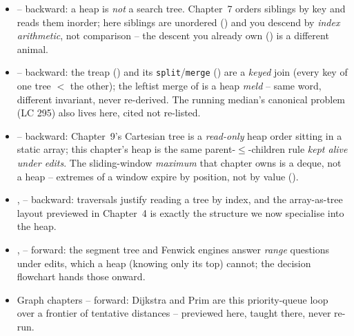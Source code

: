 
\begin{itemize}[nosep, leftmargin=1.4em]
  \item {} -- backward: a heap is \emph{not} a search tree. Chapter~7 orders siblings by key and
        reads them inorder; here siblings are unordered () and you descend by
        \emph{index arithmetic}, not comparison -- the descent you already own () is a
        different animal.
  \item {} -- backward: the treap () and its \texttt{split}/\texttt{merge}
        () are a \emph{keyed} join (every key of one tree $<$ the other); the leftist
        merge of  is a heap \emph{meld} -- same word, different invariant, never
        re-derived. The running median's canonical problem (LC 295) also lives here, cited not re-listed.
  \item {} -- backward: Chapter~9's Cartesian tree is a \emph{read-only} heap order sitting in a
        static array; this chapter's heap is the same parent-$\le$-children rule \emph{kept alive under
        edits}. The sliding-window \emph{maximum} that chapter owns is a deque, not a heap -- extremes of a
        window expire by position, not by value ().
  \item {},  -- backward: traversals justify reading a tree by index, and the
        array-as-tree layout previewed in Chapter~4 is exactly the structure we now specialise into the heap.
  \item {},  -- forward: the segment tree and Fenwick engines answer \emph{range}
        questions under edits, which a heap (knowing only its top) cannot; the decision flowchart hands
        those onward.
  \item Graph chapters -- forward: Dijkstra and Prim are this priority-queue loop over a frontier of
        tentative distances -- previewed here, taught there, never re-run.
\end{itemize}

